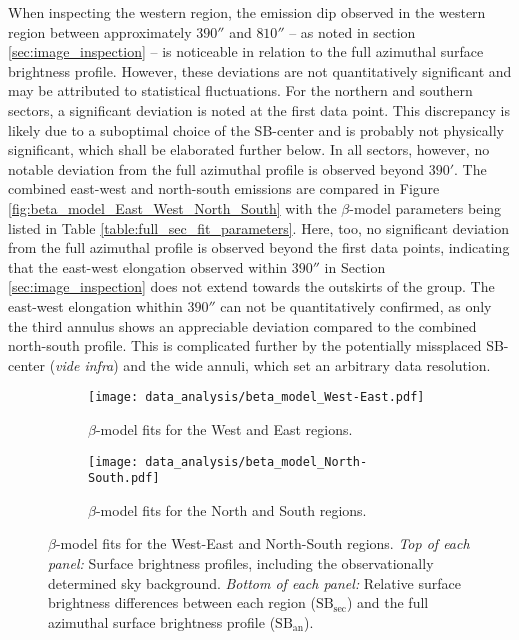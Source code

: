 When inspecting the western region, the emission dip observed in the western region between approximately \(390''\) and \(810''\) -- as noted in section \ref{sec:image_inspection} -- is noticeable in relation to the full azimuthal surface brightness profile. However, these deviations are not quantitatively significant and may be attributed to statistical fluctuations. For the northern and southern sectors, a significant deviation is noted at the first data point. This discrepancy is likely due to a suboptimal choice of the SB-center and is probably not physically significant, which shall be elaborated further below. In all sectors, however, no notable deviation from the full azimuthal profile is observed beyond \(390'\). The combined east-west and north-south emissions are compared in Figure \ref{fig:beta_model_East_West_North_South} with the \(\beta\)-model parameters being listed in Table \ref{table:full_sec_fit_parameters}. Here, too, no significant deviation from the full azimuthal profile is observed beyond the first data points, indicating that the east-west elongation observed within \(390''\) in Section \ref{sec:image_inspection} does not extend towards the outskirts of the group. The east-west elongation whithin \(390''\) can not be quantitatively confirmed, as only the third annulus shows an appreciable deviation compared to the combined north-south profile. This is complicated further by the potentially missplaced SB-center (\textit{vide infra}) and the wide annuli, which set an arbitrary data resolution. 
\begin{figure}[htbp]
    \centering
    \begin{subfigure}{\textwidth}
        \centering
        \texttt{[image: data\_analysis/beta\_model\_West-East.pdf]}
        \caption{\(\beta\)-model fits for the West and East regions.}
        \label{fig:beta_model_West_East}
    \end{subfigure}
    \vspace{0.5cm} 
    \begin{subfigure}{\textwidth}
        \centering
        \texttt{[image: data\_analysis/beta\_model\_North-South.pdf]}
        \caption{\(\beta\)-model fits for the North and South regions.}
        \label{fig:beta_model_North_South}
    \end{subfigure}
    \caption[\(\beta\)-model fits for the West-East and North-South regions.]{\(\beta\)-model fits for the West-East and North-South regions. \textit{Top of each panel:} Surface brightness profiles, including the observationally determined sky background. \textit{Bottom of each panel:} Relative surface brightness differences between each region (\(\text{SB}_{\text{sec}}\)) and the full azimuthal surface brightness profile (\(\text{SB}_{\text{an}}\)).}
    \label{fig:beta_models_West_North}
\end{figure}

